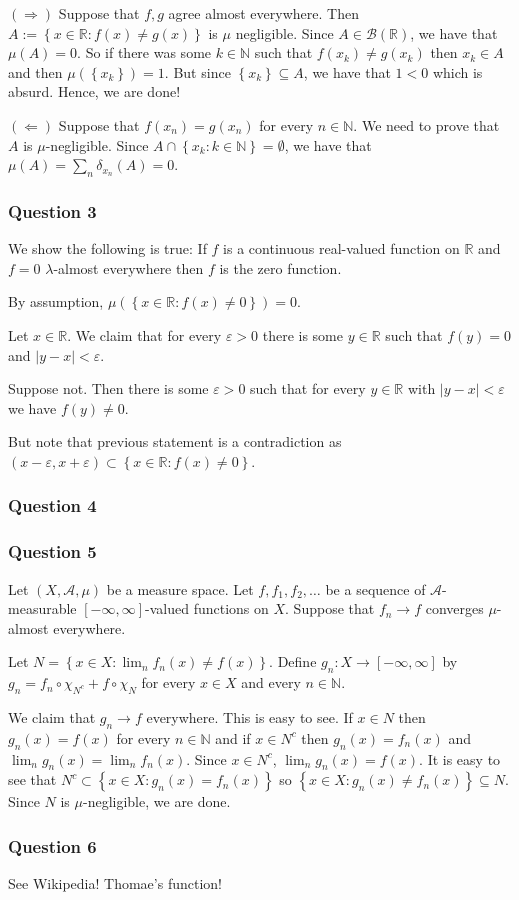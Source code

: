 \documentclass[12pt]{article}
\theoremstyle{definition}
\theoremstyle{remark}
\theoremstyle{plain}
\newcommand{\R}{\mathbb R}
\newcommand{\N}{\mathbb N}
\newcommand{\scrA}{{\mathscr A}}
\newcommand{\scrB}{{\mathscr B}}
\begin{document}
$\left( \Longrightarrow \right)$ Suppose that $f,g$ agree almost everywhere. Then $A:=\left\{ x\in \R : f(x)\ne g(x) \right\}$ is $\mu$ negligible. Since $A \in \scrB (\R)$, we have that $\mu (A) =0$. So if there was some $k\in \N$ such that $f(x_k)\not =g(x_k)$ then $x_k\in A$ and then $\mu \left( \left\{ x_k \right\} \right) =1$. But since $\left\{ x_k \right\} \subseteq A$, we have that $1 < 0$ which is absurd. Hence, we are done!

$\left( \Longleftarrow \right)$ Suppose that $f(x_n ) = g(x_n)$ for every $n\in\N$. We need to prove that $A$ is $\mu$-negligible. Since $A \cap \left\{ x_k : k\in \N \right\} = \emptyset$, we have that $\mu (A) = \sum _n \delta _{x_n} \left( A \right) =0$.

\subsubsection{Question 3}
We show the following is true: If $f$ is a continuous real-valued function on $\R$ and $f=0$ $\lambda$-almost everywhere then $f$ is the zero function.

By assumption, $\mu\left( \left\{ x\in \R : f\left( x \right)\ne 0 \right\}\right) =0$.

Let $x\in \R$. We claim that for every $\varepsilon > 0$ there is some $y\in \R$ such that $f(y)=0$ and $|y-x|<\varepsilon$.

Suppose not. Then there is some $\varepsilon >0$ such that for every $y\in \R$ with $|y-x|<\varepsilon$ we have $f(y)\ne 0$.

But note that previous statement is a contradiction as $\left( x-\varepsilon, x+\varepsilon \right) \subset \left\{ x\in \R : f(x) \ne 0 \right\}$.
\subsubsection{Question 4}

\subsubsection{Question 5}
Let $\left( X, \scrA , \mu \right)$ be a measure space. Let $f, f_1 , f_2 , \ldots$ be a sequence of $\scrA$-measurable $\left[ -\infty, \infty \right]$-valued functions on $X$. Suppose that $f_n \to f$ converges $\mu$-almost everywhere. 

Let $N=\left\{ x\in X : \lim_n f_n (x) \ne f(x) \right\}$. Define $g_n : X \to \left[ -\infty, \infty \right]$ by $g_n=f_n \circ \chi _ {N^c} + f \circ \chi _ N$ for every $x\in X$ and every $n\in\N$.

We claim that $g_n \to f$ everywhere. This is easy to see. If $x\in N$ then $g_n (x) = f(x)$ for every $n\in\N$ and if $x\in N^c$ then $g_n (x) = f_n (x)$ and $\lim_n g_n (x) = \lim_n f_n (x)$. Since $x\in N^c$, $\lim_n g_n (x) = f(x)$.
It is easy to see that $N^c \subset \left\{ x\in X : g_n (x) = f_n (x) \right\}$ so $\left\{ x\in X : g_n (x) \ne f_n (x) \right\} \subseteq N$. Since $N$ is $\mu$-negligible, we are done.


\subsubsection{Question 6}
See Wikipedia! Thomae's function!
\end{document}
